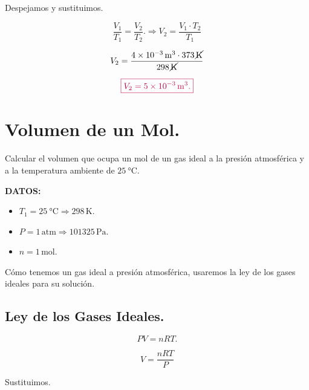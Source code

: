 \documentclass[a4paper,12pt]{article} %
\begin{document}
\begin{justify}
	Despejamos y sustituimos.
\end{justify}

\[ \frac{V_1}{T_1} = \frac{V_2}{T_2}. \Rightarrow V_2 = \frac{V_1 \cdot T_2}{T_1} \]

\vspace{\baselineskip}

\[ V_2 = \frac{4 \times 10^{-3} \, \mathrm{m}^3 \cdot 373 \, \cancel{\mathrm{K}} }{298 \, \cancel{\mathrm{K}}} \]

\vspace{\baselineskip}

\[ \textcolor{purple}{\boxed{V_2 = 5 \times 10^{-3} \, \mathrm{m}^3 .}} \]

\section{Volumen de un Mol.}

\begin{justify}
	Calcular el volumen que ocupa un mol de un gas ideal a la presión atmosférica y a la temperatura ambiente de \( \SI{25}{\degreeCelsius} \).
\end{justify}

\begin{justify}
	\textbf{DATOS:}
\end{justify}

\begin{itemize}
	\item \( T_1 = \SI{25}{\degreeCelsius} \Rightarrow 298 \, \mathrm{K}. \)
	\item \( P = 1 \, \mathrm{atm} \Rightarrow 101325 \, \mathrm{Pa}. \)
	\item \( n = 1 \, \mathrm{mol}. \)
\end{itemize}

\begin{justify}
	Cómo tenemos un gas ideal a presión atmosférica, usaremos la ley de los gases ideales para su solución.
\end{justify}

\subsection{Ley de los Gases Ideales.}

\[ PV = nRT. \]

\[ V = \frac{nRT}{P} \]

\begin{justify}
	Sustituimos.
\end{justify}
\end{document}

